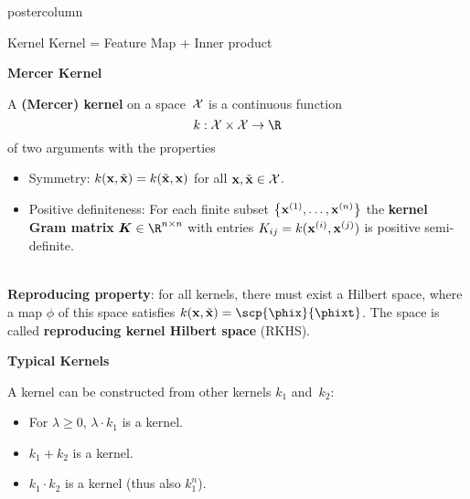 \documentclass{beamer}
\newlength{\columnheight} %
\begin{document}
\begin{frame}[fragile]{}
\begin{columns}
	\begin{column}{.31\textwidth}
		\begin{beamercolorbox}[center]{postercolumn}
			\begin{minipage}{.98\textwidth}
				\parbox[t][\columnheight]{\textwidth}{

					\begin{myblock}{Kernel}
Kernel = Feature Map + Inner product\\

\begin{codebox} \textbf{Mercer Kernel}
\end{codebox}
A \textbf{(Mercer) kernel} on a space~$\mathcal{X}$ is a
  continuous function
  $$ k : \Xspace \times \Xspace \to \R $$
  of two arguments with the properties
  \begin{itemize}[$\bullet$]
    \setlength{\itemindent}{+.3in}
    \item Symmetry: $k(\mathbf{x}, \tilde {\mathbf{x}}) = k(\tilde {\mathbf{x}}, \mathbf{x})$ for all
    $\mathbf{x}, \tilde {\mathbf{x}} \in \mathcal{X}$.
    \item Positive definiteness: For each finite subset $\left\{\mathbf{x}^{(1)}, \dots, \mathbf{x}^{(n)}\right\}$
    the \textbf{kernel Gram matrix} $\bm{K} \in \R^{n \times n}$ with entries
    $K_{ij} = k(\mathbf{x}^{(i)}, \mathbf{x}^{(j)})$ is positive semi-definite.
  \end{itemize}\\

  \textbf{Reproducing property}: for all kernels, there must exist a Hilbert space, where a map $\phi$ of this space satisfies $k(\xv, \xtil) = \scp{\phix}{\phixt}$.
  The space is called \textbf{reproducing kernel Hilbert space} (RKHS).

\begin{codebox}
      \textbf{Typical Kernels} 
    \end{codebox}	
  A kernel can be constructed from other kernels $k_1$ and~$k_2$:
  \begin{itemize}[$\bullet$]
    \setlength{\itemindent}{+.3in}
      \item For $\lambda \geq 0$, $\lambda \cdot k_1$ is a kernel.
      \item $k_1 + k_2$ is a kernel.
      \item $k_1 \cdot k_2$ is a kernel (thus also $k_1^n$).
    \end{itemize}\\



\end{myblock}}
\end{minipage}
\end{beamercolorbox}
\end{column}
\end{columns}
\end{frame}
\end{document}
